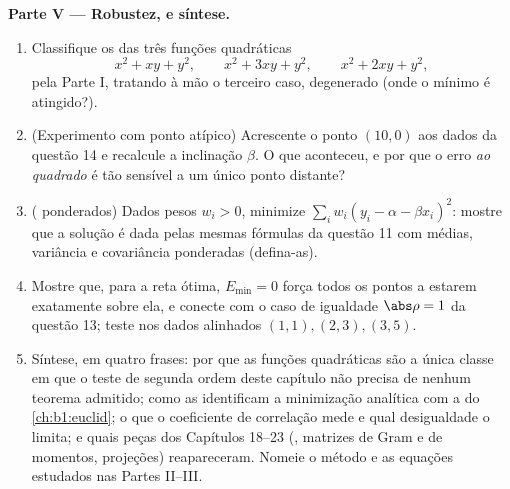 \begin{problem}
\medskip
\noindent\textbf{Parte V --- Robustez, e síntese.}
\begin{enumerate}[resume]
  \item Classifique os  das três funções quadráticas
        \[
        x^2 + xy + y^2, \qquad x^2 + 3xy + y^2, \qquad
        x^2 + 2xy + y^2 ,
        \]
        pela Parte I, tratando à mão o terceiro caso, degenerado
        (onde o mínimo é atingido?).
  \item (Experimento com ponto atípico) Acrescente o ponto $(10, 0)$
        aos dados da questão 14 e recalcule a inclinação $\beta$. O
        que aconteceu, e por que o erro \emph{ao quadrado} é tão
        sensível a um único ponto distante?
  \item ( ponderados) Dados pesos $w_i > 0$,
        minimize $\sum_i w_i(y_i - \alpha - \beta x_i)^2$: mostre que a solução é dada pelas mesmas
        fórmulas da questão 11 com médias, variância e covariância
        ponderadas (defina-as).
  \item Mostre que, para a reta ótima, $E_{\min} = 0$ força todos os pontos a
        estarem exatamente sobre ela, e conecte com o caso de
        igualdade $\abs\rho = 1$ da questão 13; teste nos dados alinhados
        $(1,1), (2,3), (3,5)$.
  \item Síntese, em quatro frases: por que as funções quadráticas são
        a única classe em que o teste de segunda ordem deste capítulo
        não precisa de nenhum teorema admitido; como as  identificam a minimização analítica com a  do \cref{ch:b1:euclid}; o que o coeficiente de correlação mede e
        qual desigualdade o limita; e quais peças dos Capítulos
        18--23 (, matrizes de Gram e de momentos, projeções)
        reapareceram. Nomeie o método e as equações estudados nas
        Partes II--III.
\end{enumerate}
\end{problem}
